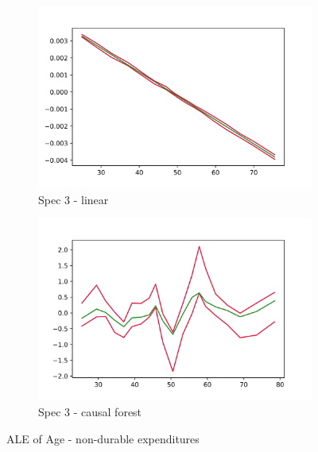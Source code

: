 \begin{figure}[t]
    \begin{subfigure}{0.5\linewidth}
        \includegraphics[width=\textwidth]{figures/ALE/chNDexp/spec3_linear_AGE.png}
        \caption{Spec 3 - linear}
    \end{subfigure}%
    \begin{subfigure}{0.5\linewidth}
        \includegraphics[width=\textwidth]{figures/ALE/chNDexp/spec1_cf_AGE.png}
        \caption{Spec 3 - causal forest}
    \end{subfigure}
    \caption{ALE of Age - non-durable expenditures}
\end{figure}
